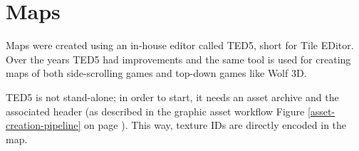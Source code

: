 \documentclass[book.tex]{subfiles}
\begin{document}
\section{Maps}
Maps were created using an in-house editor called TED5, short for Tile EDitor. Over the years TED5 had improvements and the same tool is used for creating maps of both side-scrolling games and top-down games like Wolf 3D.\\
\par
 TED5 is not stand-alone; in order to start, it needs an asset archive and the  associated header (as described in the graphic asset workflow Figure \ref{asset-creation-pipeline} on page \pageref{asset-creation-pipeline}). This way, texture IDs are directly encoded in the map.\\

 
 \par
 \\
 \par
{}\\
 


 \\
\par
\end{document}
